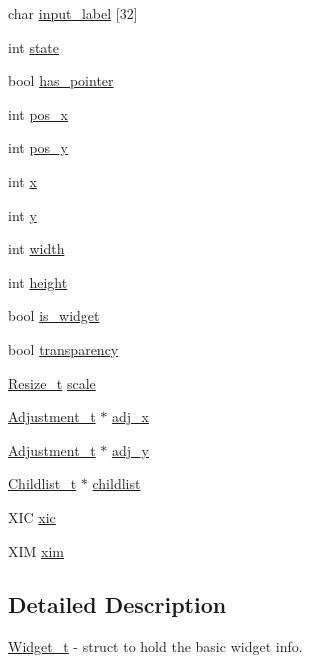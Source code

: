 \begin{DoxyCompactItemize}
\item 
char \hyperlink{structWidget__t_ac5cb454301472edeb16e563ef2149dbb}{input\+\_\+label} \mbox{[}32\mbox{]}
\item 
int \hyperlink{structWidget__t_aaa935b64805fdeb78acb015c67d6638c}{state}
\item 
bool \hyperlink{structWidget__t_ac8c396c698d816afad49fa751c3ca2c8}{has\+\_\+pointer}
\item 
int \hyperlink{structWidget__t_ae2d46ffb30bb2335a043d138fa05e1a3}{pos\+\_\+x}
\item 
int \hyperlink{structWidget__t_a9b127ac6b3f017b367351ee673e063c3}{pos\+\_\+y}
\item 
int \hyperlink{structWidget__t_aac6ce7621b682bb4ce88bac9181c34a7}{x}
\item 
int \hyperlink{structWidget__t_acb9402de44e47837e1821b93fc052b38}{y}
\item 
int \hyperlink{structWidget__t_a3204c88196ed5793250b3530dd719037}{width}
\item 
int \hyperlink{structWidget__t_a1def6d2237743e75a0b84ca0c34a6834}{height}
\item 
bool \hyperlink{structWidget__t_aff0b7ecbf87b995342d13e2efe79dfca}{is\+\_\+widget}
\item 
bool \hyperlink{structWidget__t_a42a597c21eca964c0296fc7026feb43b}{transparency}
\item 
\hyperlink{structResize__t}{Resize\+\_\+t} \hyperlink{structWidget__t_a9a2d5b53f40f5bf3914fc0694027d7ec}{scale}
\item 
\hyperlink{structAdjustment__t}{Adjustment\+\_\+t} $\ast$ \hyperlink{structWidget__t_aabc05e0a46c85d24483fae36127b45dd}{adj\+\_\+x}
\item 
\hyperlink{structAdjustment__t}{Adjustment\+\_\+t} $\ast$ \hyperlink{structWidget__t_abde95d3fb49faff5dd852f16810115e7}{adj\+\_\+y}
\item 
\hyperlink{structChildlist__t}{Childlist\+\_\+t} $\ast$ \hyperlink{structWidget__t_ac203ccbc58958a7c205897d4aba197e9}{childlist}
\item 
X\+IC \hyperlink{structWidget__t_adafb1b98ea551ef726be6c726ac2e817}{xic}
\item 
X\+IM \hyperlink{structWidget__t_a81aa76d336043a7230844d09a92113e2}{xim}
\end{DoxyCompactItemize}


\subsection{Detailed Description}
\hyperlink{structWidget__t}{Widget\+\_\+t} -\/ struct to hold the basic widget info. 


